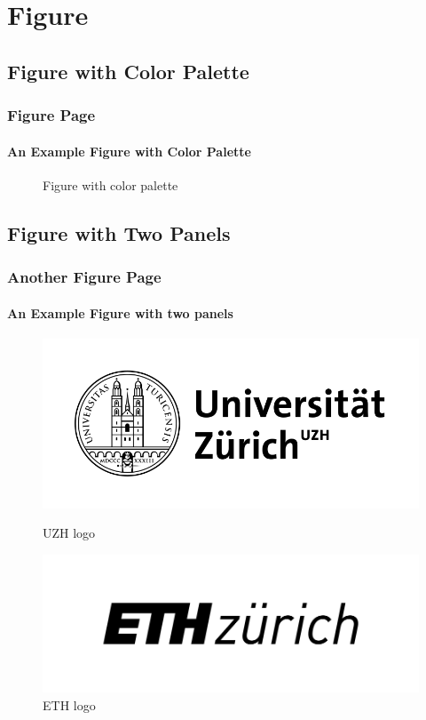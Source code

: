 \documentclass[10pt]{beamer}
\begin{document}
\section{Figure}
\subsection{Figure with Color Palette}
\begin{frame}
\frametitle{Figure Page}
\framesubtitle{An Example Figure with Color Palette}
\begin{figure}
\centering

\caption{Figure with color palette}

\end{figure}
\end{frame}


\subsection{Figure with Two Panels}
\begin{frame}
\frametitle{Another Figure Page}
\framesubtitle{An Example Figure with two panels}
\begin{figure}
\centering
\begin{minipage}[b]{0.45\textwidth}
\includegraphics[width=\linewidth]{UZH-logo.png}
\caption{UZH logo}
\end{minipage}
\begin{minipage}[b]{0.45\textwidth}
\includegraphics[width=\linewidth]{ETH-logo.png}
\caption{ETH logo}
\end{minipage}
\end{figure}
\end{frame}
\end{document}
